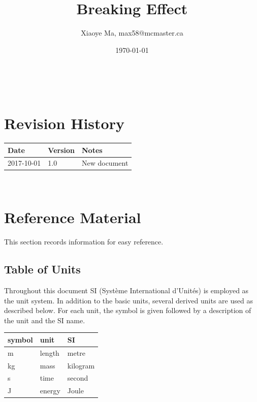 \documentclass[12pt]{article}
\begin{document}
\title{Breaking Effect} 
\author{Xiaoye Ma, max58@mcmaster.ca}
\date{\today}
	
\maketitle

~\newpage


\section{Revision History}

\begin{tabularx}{\textwidth}{p{3cm}p{2cm}X}
\toprule {\bf Date} & {\bf Version} & {\bf Notes}\\
\midrule
2017-10-01 & 1.0 & New document\\
\bottomrule
\end{tabularx}

~\newpage

\section{Reference Material}

This section records information for easy reference.

\subsection{Table of Units}

Throughout this document SI (Syst\`{e}me International d'Unit\'{e}s) is employed
as the unit system.  In addition to the basic units, several derived units are
used as described below.  For each unit, the symbol is given followed by a
description of the unit and the SI name.
~\newline

\renewcommand{\arraystretch}{1.2}
  \noindent \begin{tabular}{l l l} 
    \toprule		
    \textbf{symbol} & \textbf{unit} & \textbf{SI}\\
    \midrule 
    \si{\metre} & length & metre\\
    \si{\kilogram} & mass	& kilogram\\
    \si{\second} & time & second\\
    \si{\joule} & energy & Joule\\
    \bottomrule
  \end{tabular}
\end{document}
